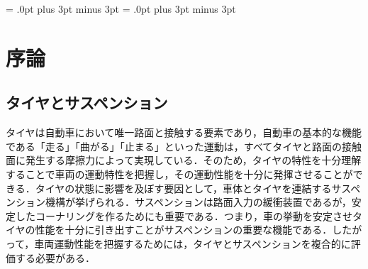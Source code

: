 \documentclass[a4paper,12pt]{article_vdlab_sotsuron}
\begin{document}
\kanjiskip = .0pt plus 3pt minus 3pt
\xkanjiskip = .0pt plus 3pt minus 3pt
\small
{}


\begin{center}
\end{center}

\tableofcontents


\newpage
\section{序論}
\subsection{タイヤとサスペンション}
タイヤは自動車において唯一路面と接触する要素であり，自動車の基本的な機能である「走る」「曲がる」「止まる」といった運動は，すべてタイヤと路面の接触面に発生する摩擦力によって実現している\cite{uno}．そのため，タイヤの特性を十分理解することで車両の運動特性を把握し，その運動性能を十分に発揮させることができる\cite{nasugawa}．タイヤの状態に影響を及ぼす要因として，車体とタイヤを連結するサスペンション機構が挙げられる．サスペンションは路面入力の緩衝装置であるが，安定したコーナリングを作るためにも重要である．つまり，車の挙動を安定させタイヤの性能を十分に引き出すことがサスペンションの重要な機能である．したがって，車両運動性能を把握するためには，タイヤとサスペンションを複合的に評価する必要がある．

\end{document}
